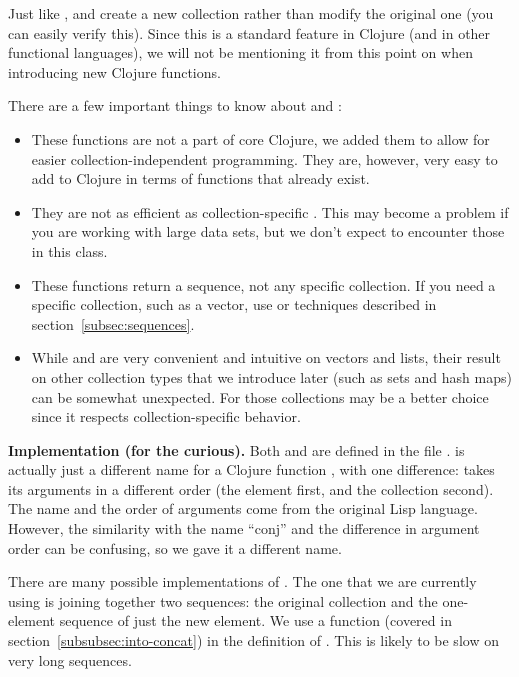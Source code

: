 Just like ,  and  create a new collection rather than modify the original one (you can easily verify this). Since this is a standard feature in Clojure (and in other functional languages), we will not be mentioning it from this point on when introducing new Clojure functions.  

There are a few important things to know about  and :
\begin{itemize}
\item These functions are not a part of core Clojure, we added them to allow for easier collection-independent programming. They are, however, very easy to add to Clojure in terms of functions that already exist. 
\item They are not as efficient as collection-specific . This may become a problem if you are working with large data sets, but we don't expect to encounter those in this class. 
\item These functions return a sequence, not any specific collection. If you need a specific collection, such as a vector, use  or techniques described in section~\ref{subsec:sequences}.
\item While   and  are very convenient and intuitive on vectors and lists, their result on other  collection types that we introduce later (such as sets and hash maps) can be somewhat unexpected. For those collections  may be a better choice since it respects collection-specific behavior. 
\end{itemize}

{\bf Implementation (for the curious).} Both  and  are defined in the file .  is actually just a different name for a Clojure function , with one difference:  takes its arguments in a different order (the element first, and the collection second). The name  and the order of arguments come from the original Lisp language. However, the similarity with the name ``conj''  and the difference in argument order can be confusing, so we gave it a different name. 

There are many possible implementations of . The one that we are currently using is joining together two sequences: the original collection and the one-element sequence of just the new element. We use a function  (covered in section~\ref{subsubsec:into-concat}) in the definition of . This is likely to be slow on very long sequences.

